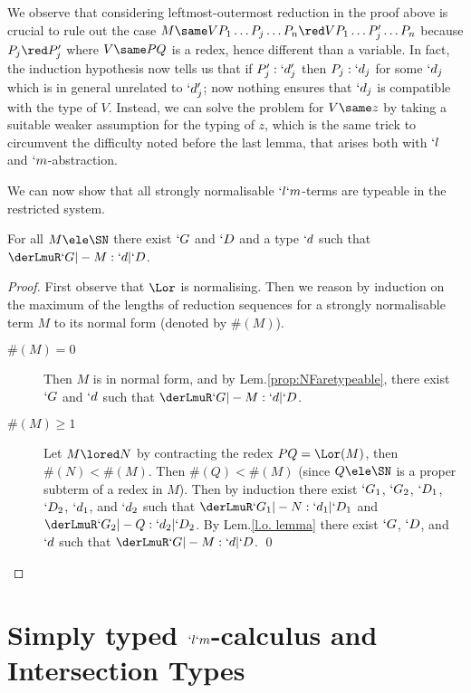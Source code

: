 \documentclass{lmcs}
\begin{document}
We observe that considering leftmost-outermost reduction in the proof above is crucial to rule out the case $M \same V P_1 \dots P_j \dots P_n \red V P_1 \dots P'_j \dots P_n$ because $P_j\red P'_j$ where $V \same PQ$ is a redex, hence different than a variable. 
In fact, the induction hypothesis now tells us that if $P'_j:`d'_j$ then $P_j:`d_j$ for some $`d_j$ which is in general unrelated to $`d'_j$; now nothing ensures that $`d_j$ is compatible with the type of $V$. 
Instead, we can solve the problem for $V \same z$ by taking a suitable weaker assumption for the typing of $z$, which is the same trick to circumvent the difficulty noted before the last lemma, that arises both with $`l$ and $`m$-abstraction.

\newpage

We can now show that all strongly normalisable $`l`m$-terms are typeable in the restricted system.

 \begin{thm} \label{thm:typeableAreSN}
For all $M \ele \SN$ there exist $`G$ and $`D $ and a type $`d$ such that $ \derLmuR `G |- M : `d | `D $.
 \end{thm}

 \begin{proof}
First observe that $\Lor$ is normalising. %
Then we reason by induction on the maximum of the lengths of reduction sequences for a strongly normalisable term $M$ to its normal form (denoted by $\#(M)$).

 \begin {description}
 \item [$ \#(M) = 0 $] 
Then $M$ is in normal form, and by Lem.\skp\ref{prop:NFaretypeable}, there exist $`G$ and $ `d$ such that $\derLmuR `G |- M : `d | `D $.

 \item [$ \#(M)\geq 1 $] 
Let $M\lored N$ by contracting the redex $PQ = \Lor(M)$, then $\#(N) < \#(M)$.
Then $\#(Q) < \#(M)$ (since $Q \ele \SN$ is a proper subterm of a redex in $M$). Then by induction there exist $`G_1$, $`G_2$, $`D_1$, $`D_2$, $`d_1$, and $`d_2$ such that $\derLmuR `G_1 |- N : `d_1 | `D_1 $ and $\derLmuR `G_2 |- Q : `d_2 | `D_2 $.
By Lem.\skp\ref {l.o. lemma} there exist $`G$, $`D $, and $ `d$ such that $\derLmuR `G |- M : `d | `D $.%
\qed

 \end{description}
 \end{proof}


 \section{Simply typed $`l`m$-calculus and Intersection Types} \label{sec:Parigot}
\end{document}
